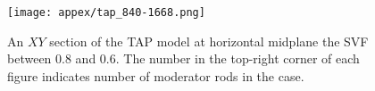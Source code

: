 \newpage
\begin{figure}[htp!] %
	\centering
	\texttt{[image: appex/tap\_840-1668.png]}
			\vspace{-3mm}
	\caption{An $XY$ section of the \gls{TAP} model at horizontal midplane the 
	\gls{SVF} between 0.8 and 0.6. The number in the top-right corner of 
	each figure indicates number of moderator rods in the case.}
	\label{fig:tap-840-1668}
\end{figure}

